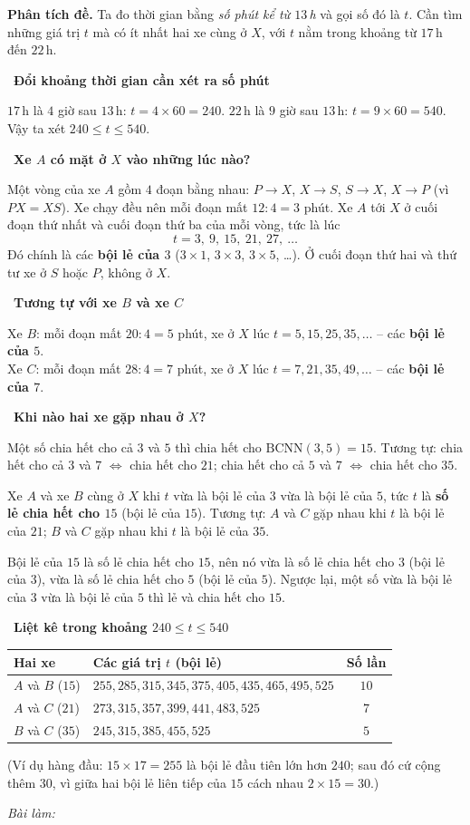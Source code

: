 \documentclass[11pt]{article}
\newif\ifsol \solfalse
\newcommand{\probsol}[1]{%
  \begin{lrbox}{\solmeasure}\begin{minipage}{\dimexpr\linewidth-24pt\relax}#1\end{minipage}\end{lrbox}%
  \ifsol
    \begin{solbox}#1\end{solbox}%
  \else
    \setlength{\solht}{\dimexpr\ht\solmeasure+\dp\solmeasure+0.85cm\relax}%
    \ifdim\solht<1.35cm\setlength{\solht}{1.35cm}\fi
    \ifdim\solht>\StudentMaxWork\setlength{\solht}{\StudentMaxWork}\fi
    \begin{tcolorbox}[colback=white,colframe=Line,boxrule=0.8pt,arc=5pt,
      left=8pt,right=8pt,top=4pt,bottom=4pt,height=\solht]{\footnotesize\color{Slate}\itshape\WorkWord}\end{tcolorbox}%
  \fi}
\newlength{\StudentMaxWork}\setlength{\StudentMaxWork}{7.5cm}
\newcommand{\step}[2]{\par\smallskip\noindent{\bfseries\color{tmBlue!85!black}\StepWord~#1.}\ {\bfseries #2}\par\nopagebreak}
\def\WorkWord{Bài làm:}
\def\StepWord{Bước}
\begin{document}
\probsol{
\textbf{Phân tích đề.} Ta đo thời gian bằng \emph{số phút kể từ $13$\,h} và gọi số đó là $t$. Cần tìm
những giá trị $t$ mà có ít nhất hai xe cùng ở $X$, với $t$ nằm trong khoảng từ $17$\,h đến $22$\,h.

\step{1}{Đổi khoảng thời gian cần xét ra số phút}
$17$\,h là $4$ giờ sau $13$\,h: $t=4\times60=240$. \quad $22$\,h là $9$ giờ sau $13$\,h: $t=9\times60=540$.
Vậy ta xét $240\le t\le540$.

\step{2}{Xe $A$ có mặt ở $X$ vào những lúc nào?}
Một vòng của xe $A$ gồm $4$ đoạn bằng nhau: $P\to X$, $X\to S$, $S\to X$, $X\to P$ (vì $PX=XS$).
Xe chạy đều nên mỗi đoạn mất $12:4=3$ phút. Xe $A$ tới $X$ ở cuối đoạn thứ nhất và cuối đoạn thứ ba
của mỗi vòng, tức là lúc
\[t=3,\ 9,\ 15,\ 21,\ 27,\ \dots\]
Đó chính là các \textbf{bội lẻ của $3$} ($3\times1$, $3\times3$, $3\times5$, \dots). Ở cuối đoạn thứ hai và thứ tư
xe ở $S$ hoặc $P$, không ở $X$.

\step{3}{Tương tự với xe $B$ và xe $C$}
Xe $B$: mỗi đoạn mất $20:4=5$ phút, xe ở $X$ lúc $t=5,15,25,35,\dots$ -- các \textbf{bội lẻ của $5$}.\\
Xe $C$: mỗi đoạn mất $28:4=7$ phút, xe ở $X$ lúc $t=7,21,35,49,\dots$ -- các \textbf{bội lẻ của $7$}.

\step{4}{Khi nào hai xe gặp nhau ở $X$?}
\begin{recallbox}Một số chia hết cho cả $3$ và $5$ thì chia hết cho $\text{BCNN}(3,5)=15$. Tương tự:
chia hết cho cả $3$ và $7$ $\Leftrightarrow$ chia hết cho $21$; chia hết cho cả $5$ và $7$ $\Leftrightarrow$
chia hết cho $35$.\end{recallbox}
Xe $A$ và xe $B$ cùng ở $X$ khi $t$ vừa là bội lẻ của $3$ vừa là bội lẻ của $5$, tức $t$ là \textbf{số lẻ chia hết cho $15$}
(bội lẻ của $15$). Tương tự: $A$ và $C$ gặp nhau khi $t$ là bội lẻ của $21$; $B$ và $C$ gặp nhau khi $t$ là bội lẻ của $35$.
\begin{proofbox}Bội lẻ của $15$ là số lẻ chia hết cho $15$, nên nó vừa là số lẻ chia hết cho $3$ (bội lẻ của $3$), vừa là
số lẻ chia hết cho $5$ (bội lẻ của $5$). Ngược lại, một số vừa là bội lẻ của $3$ vừa là bội lẻ của $5$ thì lẻ và chia
hết cho $15$.\end{proofbox}

\step{5}{Liệt kê trong khoảng $240\le t\le540$}
\begin{center}\begin{tabular}{|l|l|c|}\hline
Hai xe & Các giá trị $t$ (bội lẻ) & Số lần\\\hline
$A$ và $B$ ($15$) & $255, 285, 315, 345, 375, 405, 435, 465, 495, 525$ & $10$\\\hline
$A$ và $C$ ($21$) & $273, 315, 357, 399, 441, 483, 525$ & $7$\\\hline
$B$ và $C$ ($35$) & $245, 315, 385, 455, 525$ & $5$\\\hline
\end{tabular}\end{center}
(Ví dụ hàng đầu: $15\times17=255$ là bội lẻ đầu tiên lớn hơn $240$; sau đó cứ cộng thêm $30$, vì giữa hai
bội lẻ liên tiếp của $15$ cách nhau $2\times15=30$.)

}
\end{document}
